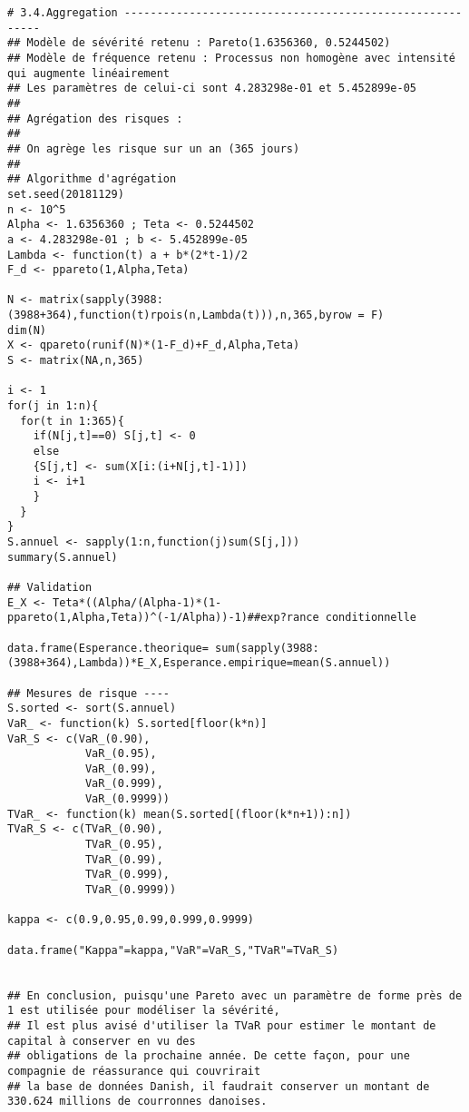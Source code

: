 \begin{verbatim}
# 3.4.Aggregation ---------------------------------------------------------
## Modèle de sévérité retenu : Pareto(1.6356360, 0.5244502)
## Modèle de fréquence retenu : Processus non homogène avec intensité qui augmente linéairement
## Les paramètres de celui-ci sont 4.283298e-01 et 5.452899e-05
##
## Agrégation des risques : 
##
## On agrège les risque sur un an (365 jours)
##
## Algorithme d'agrégation
set.seed(20181129)
n <- 10^5
Alpha <- 1.6356360 ; Teta <- 0.5244502
a <- 4.283298e-01 ; b <- 5.452899e-05
Lambda <- function(t) a + b*(2*t-1)/2
F_d <- ppareto(1,Alpha,Teta)

N <- matrix(sapply(3988:(3988+364),function(t)rpois(n,Lambda(t))),n,365,byrow = F)
dim(N)
X <- qpareto(runif(N)*(1-F_d)+F_d,Alpha,Teta)
S <- matrix(NA,n,365)

i <- 1
for(j in 1:n){
  for(t in 1:365){
    if(N[j,t]==0) S[j,t] <- 0
    else 
    {S[j,t] <- sum(X[i:(i+N[j,t]-1)])
    i <- i+1
    }
  }
}
S.annuel <- sapply(1:n,function(j)sum(S[j,]))
summary(S.annuel)

## Validation
E_X <- Teta*((Alpha/(Alpha-1)*(1-ppareto(1,Alpha,Teta))^(-1/Alpha))-1)##exp?rance conditionnelle

data.frame(Esperance.theorique= sum(sapply(3988:(3988+364),Lambda))*E_X,Esperance.empirique=mean(S.annuel))

## Mesures de risque ----
S.sorted <- sort(S.annuel)
VaR_ <- function(k) S.sorted[floor(k*n)]
VaR_S <- c(VaR_(0.90),
            VaR_(0.95),
            VaR_(0.99),
            VaR_(0.999),
            VaR_(0.9999))
TVaR_ <- function(k) mean(S.sorted[(floor(k*n+1)):n])
TVaR_S <- c(TVaR_(0.90),
            TVaR_(0.95),
            TVaR_(0.99),
            TVaR_(0.999),
            TVaR_(0.9999))

kappa <- c(0.9,0.95,0.99,0.999,0.9999)

data.frame("Kappa"=kappa,"VaR"=VaR_S,"TVaR"=TVaR_S)


## En conclusion, puisqu'une Pareto avec un paramètre de forme près de 1 est utilisée pour modéliser la sévérité,
## Il est plus avisé d'utiliser la TVaR pour estimer le montant de capital à conserver en vu des
## obligations de la prochaine année. De cette façon, pour une compagnie de réassurance qui couvrirait
## la base de données Danish, il faudrait conserver un montant de 330.624 millions de courronnes danoises.

\end{verbatim}
